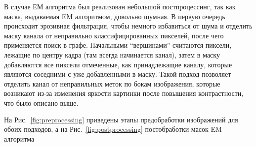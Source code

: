 В случае ЕМ алгоритма был реализован небольшой постпроцессинг, так как маска, выдаваемая EM алгоритмом, довольно шумная. В первую очередь происходит эрозивная 
фильтрация, чтобы немного избавиться от шума и отделить маску канала от неправильно классифицированных пикселей, после чего применяется поиск в графе. Начальными 
``вершинами'' считаются пиксели, лежащие по центру кадра (там всегда начинается канал), затем в маску добавляются все пиксели отмеченные, как принадлежащие каналу, 
которые являются соседними с уже добавленными в маску. Такой подход позволяет отделить канал от неправильных меток по бокам изображения, которые возникают из-за
изменения яркости картинки после повышения контрастности, что было описано выше.

На Рис.~\ref{fig:preprocessing} приведены этапы предобработки изображений для обоих подходов, а на Рис.~\ref{fig:postprocessing} постобработки 
масок EM алгоритма